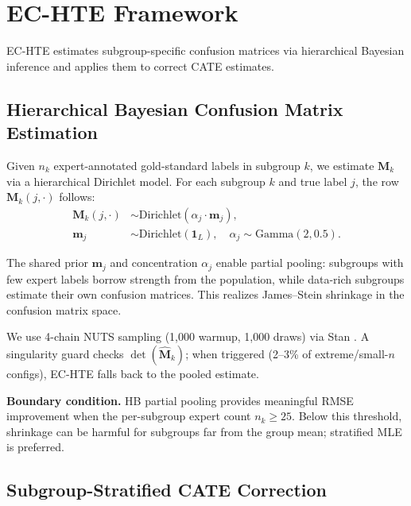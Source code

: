 \documentclass[11pt,twocolumn]{article}
\theoremstyle{remark}
\newcommand{\vect}[1]{\boldsymbol{#1}}
\begin{document}
\section{EC-HTE Framework}\label{sec:method}

EC-HTE estimates subgroup-specific confusion matrices via hierarchical Bayesian inference and applies them to correct CATE estimates.

\subsection{Hierarchical Bayesian Confusion Matrix Estimation}\label{sec:hb}

Given $n_k$ expert-annotated gold-standard labels in subgroup $k$, we estimate $\vect{M}_k$ via a hierarchical Dirichlet model.
For each subgroup $k$ and true label $j$, the row $\vect{M}_k(j, \cdot)$ follows:
\begin{align}
\vect{M}_k(j, \cdot) &\sim \mathrm{Dirichlet}(\alpha_j \cdot \vect{m}_j), \\
\vect{m}_j &\sim \mathrm{Dirichlet}(\vect{1}_L), \quad
\alpha_j \sim \mathrm{Gamma}(2, 0.5).
\end{align}

The shared prior $\vect{m}_j$ and concentration $\alpha_j$ enable partial pooling: subgroups with few expert labels borrow strength from the population, while data-rich subgroups estimate their own confusion matrices.
This realizes James--Stein shrinkage \cite{james1961estimation, efron1975data} in the confusion matrix space.

We use 4-chain NUTS sampling (1{,}000 warmup, 1{,}000 draws) via Stan \cite{stan2023}.
A singularity guard checks $\det(\hat{\vect{M}}_k)$; when triggered (2--3\% of extreme/small-$n$ configs), EC-HTE falls back to the pooled estimate.

\textbf{Boundary condition.}
HB partial pooling provides meaningful RMSE improvement when the per-subgroup expert count $n_k \geq 25$.
Below this threshold, shrinkage can be harmful for subgroups far from the group mean; stratified MLE is preferred.

\subsection{Subgroup-Stratified CATE Correction}
\end{document}
